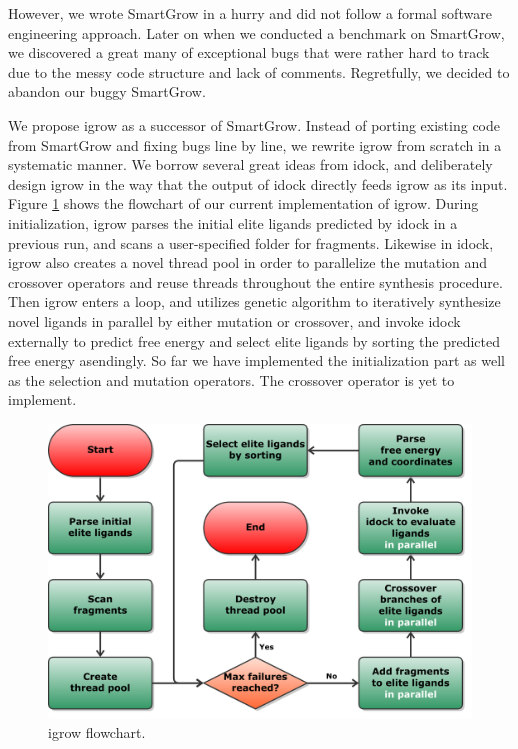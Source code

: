 However, we wrote SmartGrow in a hurry and did not follow a formal software engineering approach. Later on when we conducted a benchmark on SmartGrow, we discovered a great many of exceptional bugs that were rather hard to track due to the messy code structure and lack of comments. Regretfully, we decided to abandon our buggy SmartGrow.

We propose igrow as a successor of SmartGrow. Instead of porting existing code from SmartGrow and fixing bugs line by line, we rewrite igrow from scratch in a systematic manner. We borrow several great ideas from idock, and deliberately design igrow in the way that the output of idock directly feeds igrow as its input. Figure \ref{igrow:Flowchart} shows the flowchart of our current implementation of igrow. During initialization, igrow parses the initial elite ligands predicted by idock in a previous run, and scans a user-specified folder for fragments. Likewise in idock, igrow also creates a novel thread pool in order to parallelize the mutation and crossover operators and reuse threads throughout the entire synthesis procedure. Then igrow enters a loop, and utilizes genetic algorithm to iteratively synthesize novel ligands in parallel by either mutation or crossover, and invoke idock externally to predict free energy and select elite ligands by sorting the predicted free energy asendingly. So far we have implemented the initialization part as well as the selection and mutation operators. The crossover operator is yet to implement.

\begin{figure}
\centering
\includegraphics[width=\textwidth]{igrow/Flowchart.pdf}
\caption{igrow flowchart.}
\label{igrow:Flowchart}
\end{figure}

